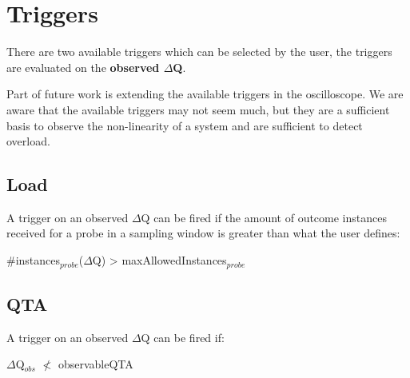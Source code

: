\section{Triggers}
    There are two available triggers which can be selected by the user, the triggers are evaluated on the \textbf{observed $\Delta$Q}.

    Part of future work is extending the available triggers in the oscilloscope. We are aware that the available triggers may not seem much, but they are a sufficient basis to observe the non-linearity of a system and are sufficient to detect overload.
    \subsection{Load}
        A trigger on an observed $\Delta$Q can be fired if the amount of outcome instances received for a probe in a sampling window is greater than what the user defines:
    \begin{center}
        \#instances$_{probe}$($\Delta$Q) > maxAllowedInstances$_{probe}$ 
    \end{center}

    \subsection{QTA}
        A trigger on an observed $\Delta$Q can be fired if:
        \begin{center}
            $\Delta$Q$_{obs}$ $\nless$ observableQTA
        \end{center}
